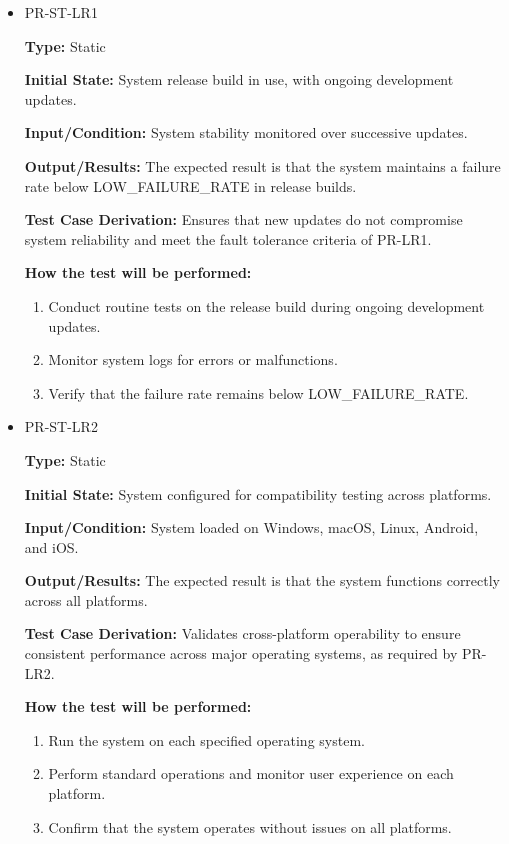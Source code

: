 \documentclass[12pt, titlepage]{article}
\begin{document}
\begin{itemize}
  \item PR-ST-LR1
  \begin{mdframed}[linewidth=0.5mm]
      \textbf{Type:} Static \par
      \textbf{Initial State:} System release build in use, with ongoing development updates. \par
      \textbf{Input/Condition:} System stability monitored over successive updates. \par
      \textbf{Output/Results:} The expected result is that the system maintains a failure rate below LOW\_FAILURE\_RATE in release builds. \par
      \textbf{Test Case Derivation:} Ensures that new updates do not compromise system reliability and meet the fault tolerance criteria of PR-LR1. \par
      \textbf{How the test will be performed:}
      \begin{enumerate}[noitemsep]
        \item Conduct routine tests on the release build during ongoing development updates.
        \item Monitor system logs for errors or malfunctions.
        \item Verify that the failure rate remains below LOW\_FAILURE\_RATE.
      \end{enumerate}
  \end{mdframed}

  \item PR-ST-LR2
  \begin{mdframed}[linewidth=0.5mm]
      \textbf{Type:} Static \par
      \textbf{Initial State:} System configured for compatibility testing across platforms. \par
      \textbf{Input/Condition:} System loaded on Windows, macOS, Linux, Android, and iOS. \par
      \textbf{Output/Results:} The expected result is that the system functions correctly across all platforms. \par
      \textbf{Test Case Derivation:} Validates cross-platform operability to ensure consistent performance across major operating systems, as required by PR-LR2. \par
      \textbf{How the test will be performed:}
      \begin{enumerate}[noitemsep]
        \item Run the system on each specified operating system.
        \item Perform standard operations and monitor user experience on each platform.
        \item Confirm that the system operates without issues on all platforms.
      \end{enumerate}
  \end{mdframed}
\end{itemize}
\end{document}
